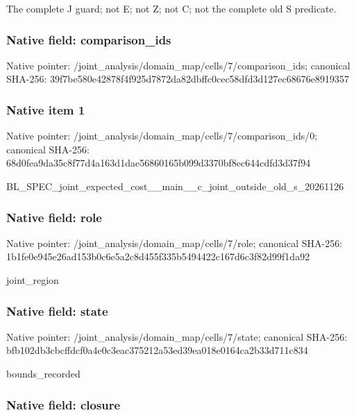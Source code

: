 \documentclass[10pt,a4paper]{article}
\begin{document}
The complete J guard; not E; not Z; not C; not the complete old S predicate.


\subsubsection{Native field: comparison\_ids}


Native pointer: /joint\_analysis/domain\_m\allowbreak{}ap/cells/7/comparison\_id\allowbreak{}s; canonical SHA-256: 39f7be580e42878f4f925d78\allowbreak{}72da82dbffc0cec58dfd3d12\allowbreak{}7ec68676e8919357



\subsubsection{Native item 1}


Native pointer: /joint\_analysis/domain\_m\allowbreak{}ap/cells/7/comparison\_id\allowbreak{}s/0; canonical SHA-256: 68d0fea9da35c8f77d4a163d\allowbreak{}1dae56860165b099d3370bf8\allowbreak{}ec644cdfd3d37f94


BL\_SPEC\_joint\_expected\_c\allowbreak{}ost\_\_main\_\_c\_joint\_outsi\allowbreak{}de\_old\_s\_20261126


\subsubsection{Native field: role}


Native pointer: /joint\_analysis/domain\_map/cells/7/role; canonical SHA-256: 1b1fe0e945e26ad153b0c6e5\allowbreak{}a2c8d455f335b5494422c167\allowbreak{}d6c3f82d99f1da92


joint\_region


\subsubsection{Native field: state}


Native pointer: /joint\_analysis/domain\_m\allowbreak{}ap/cells/7/state; canonical SHA-256: bfb102db3cbcffdcf0a4e0c3\allowbreak{}eac375212a53ed39ea018e01\allowbreak{}64ca2b33d711c834


bounds\_recorded


\subsubsection{Native field: closure}
\end{document}

